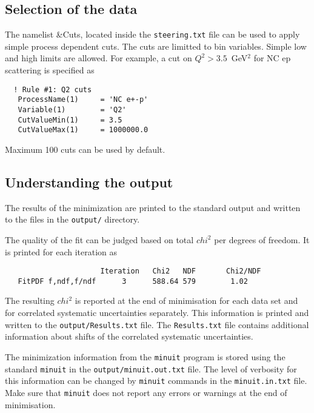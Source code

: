 \documentclass[11pt,a4paper]{article}
\begin{document}
\subsection{Selection of the data}
  The namelist \&Cuts, located inside the {\tt steering.txt} file can be used to apply
  simple process dependent cuts. The cuts are limitted to bin variables.
  Simple low and high limits are allowed. For example, a cut on $Q^2>3.5$~GeV$^2$ for
  NC ep scattering is specified as

\begin{verbatim}
  ! Rule #1: Q2 cuts
   ProcessName(1)     = 'NC e+-p'
   Variable(1)        = 'Q2'
   CutValueMin(1)     = 3.5 
   CutValueMax(1)     = 1000000.0
\end{verbatim}

  Maximum 100 cuts can be used by default.

\subsection{Understanding the output}
  The results of the minimization are printed to the standard output and written
  to the files in the {\tt output/} directory. 

  The quality of the fit can be judged based on total $chi^2$ per degrees of freedom.
  It is printed for each iteration as 
\begin{verbatim}
                      Iteration   Chi2   NDF       Chi2/NDF
   FitPDF f,ndf,f/ndf      3      588.64 579        1.02
\end{verbatim}
  The resulting $chi^2$ is reported at the end of minimisation for each data set and for correlated 
  systematic uncertainties separately. This information is printed and written
  to the {\tt output/Results.txt} file. The {\tt Results.txt} file contains additional 
  information about shifts of the correlated systematic uncertainties.

  The minimization information from the {\tt minuit} program is stored using the standard {\tt minuit} in the {\tt output/minuit.out.txt}
  file. The level of verbosity for this information can be changed by {\tt minuit} commands
  in the {\tt minuit.in.txt} file. Make sure that {\tt minuit} does not report any errors
  or warnings at the end of minimisation.
  
\end{document}
